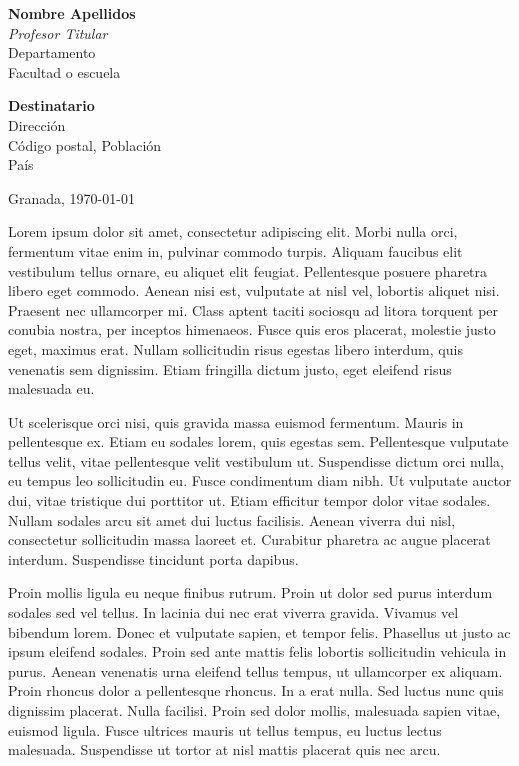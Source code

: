\documentclass[noDatosCabecera, noDatosPie]{UGR-generico}
\newcommand{\miNombre}{Nombre Apellidos\xspace}
\newcommand{\miCargo}{Profesor Titular\xspace}
\newcommand{\miDepartamento}{Departamento}
\newcommand{\miCentro}{Facultad o escuela}
\newcommand{\desNombre}{Destinatario\xspace}
\newcommand{\desDireccion}{Dirección\xspace}
\newcommand{\desCP}{Código postal\xspace}
\newcommand{\desPoblacion}{Población\xspace}
\newcommand{\desPais}{País\xspace}
\begin{document}
\vspace*{-15mm}\noindent{\color{ugr}\rule{36mm}{0.5pt}}
\par\vspace{-2mm}
\begin{minipage}[t]{36mm}
  \textbf{\miNombre} \\ 
  \textit{\miCargo} \\
  \miDepartamento \\ 
  \miCentro
\end{minipage}%
\hspace{0.2\linewidth}
\begin{minipage}[t]{0.3\linewidth}
  \textbf{\desNombre}\\
  \desDireccion \\
  \desCP, \desPoblacion \\
  \desPais
\end{minipage}
\vspace{25mm}


Granada, \today
\medskip

Lorem ipsum dolor sit amet, consectetur adipiscing elit. Morbi nulla orci, fermentum vitae enim in, pulvinar commodo turpis. Aliquam faucibus elit vestibulum tellus ornare, eu aliquet elit feugiat. Pellentesque posuere pharetra libero eget commodo. Aenean nisi est, vulputate at nisl vel, lobortis aliquet nisi. Praesent nec ullamcorper mi. Class aptent taciti sociosqu ad litora torquent per conubia nostra, per inceptos himenaeos. Fusce quis eros placerat, molestie justo eget, maximus erat. Nullam sollicitudin risus egestas libero interdum, quis venenatis sem dignissim. Etiam fringilla dictum justo, eget eleifend risus malesuada eu.

Ut scelerisque orci nisi, quis gravida massa euismod fermentum. Mauris in pellentesque ex. Etiam eu sodales lorem, quis egestas sem. Pellentesque vulputate tellus velit, vitae pellentesque velit vestibulum ut. Suspendisse dictum orci nulla, eu tempus leo sollicitudin eu. Fusce condimentum diam nibh. Ut vulputate auctor dui, vitae tristique dui porttitor ut. Etiam efficitur tempor dolor vitae sodales. Nullam sodales arcu sit amet dui luctus facilisis. Aenean viverra dui nisl, consectetur sollicitudin massa laoreet et. Curabitur pharetra ac augue placerat interdum. Suspendisse tincidunt porta dapibus.

Proin mollis ligula eu neque finibus rutrum. Proin ut dolor sed purus interdum sodales sed vel tellus. In lacinia dui nec erat viverra gravida. Vivamus vel bibendum lorem. Donec et vulputate sapien, et tempor felis. Phasellus ut justo ac ipsum eleifend sodales. Proin sed ante mattis felis lobortis sollicitudin vehicula in purus. Aenean venenatis urna eleifend tellus tempus, ut ullamcorper ex aliquam. Proin rhoncus dolor a pellentesque rhoncus. In a erat nulla. Sed luctus nunc quis dignissim placerat. Nulla facilisi. Proin sed dolor mollis, malesuada sapien vitae, euismod ligula. Fusce ultrices mauris ut tellus tempus, eu luctus lectus malesuada. Suspendisse ut tortor at nisl mattis placerat quis nec arcu. 
\end{document}
